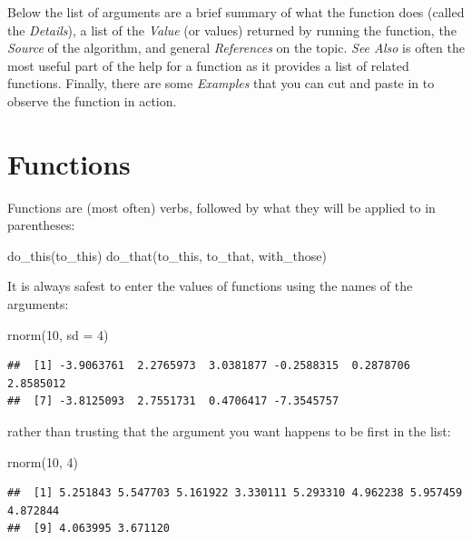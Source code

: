 \documentclass[
]{book}
\newenvironment{Shaded}{\begin{snugshade}}{\end{snugshade}}
\newcommand{\AttributeTok}[1]{\textcolor[rgb]{0.77,0.63,0.00}{#1}}
\newcommand{\DecValTok}[1]{\textcolor[rgb]{0.00,0.00,0.81}{#1}}
\newcommand{\FunctionTok}[1]{\textcolor[rgb]{0.00,0.00,0.00}{#1}}
\newcommand{\NormalTok}[1]{#1}
\begin{document}
Below the list of arguments are a brief summary of what the function does (called the \emph{Details}), a list of the \emph{Value} (or values) returned by running the function, the \emph{Source} of the algorithm, and general \emph{References} on the topic. \emph{See Also} is often the most useful part of the help for a function as it provides a list of related functions. Finally, there are some \emph{Examples} that you can cut and paste in to observe the function in action.

\hypertarget{functions}{%
\section{Functions}\label{functions}}

Functions are (most often) verbs, followed by what they will be applied to in parentheses:

\begin{Shaded}
\begin{Highlighting}[]
\FunctionTok{do\_this}\NormalTok{(to\_this)}
\FunctionTok{do\_that}\NormalTok{(to\_this, to\_that, with\_those)}
\end{Highlighting}
\end{Shaded}

It is always safest to enter the values of functions using the names of the arguments:

\begin{Shaded}
\begin{Highlighting}[]
\FunctionTok{rnorm}\NormalTok{(}\DecValTok{10}\NormalTok{, }\AttributeTok{sd =} \DecValTok{4}\NormalTok{)}
\end{Highlighting}
\end{Shaded}

\begin{verbatim}
##  [1] -3.9063761  2.2765973  3.0381877 -0.2588315  0.2878706  2.8585012
##  [7] -3.8125093  2.7551731  0.4706417 -7.3545757
\end{verbatim}

rather than trusting that the argument you want happens to be first in the list:

\begin{Shaded}
\begin{Highlighting}[]
\FunctionTok{rnorm}\NormalTok{(}\DecValTok{10}\NormalTok{, }\DecValTok{4}\NormalTok{)}
\end{Highlighting}
\end{Shaded}

\begin{verbatim}
##  [1] 5.251843 5.547703 5.161922 3.330111 5.293310 4.962238 5.957459 4.872844
##  [9] 4.063995 3.671120
\end{verbatim}
\end{document}
